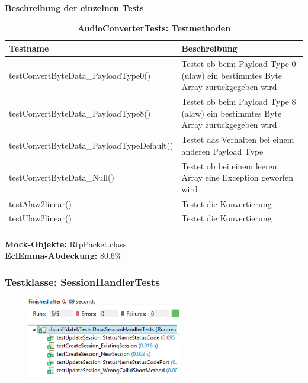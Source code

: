 \documentclass[a4,12pt]{scrartcl}
\begin{document}
\textbf{Beschreibung der einzelnen Tests}
\begin{longtable}{ p{9cm} p{6.45cm} }   
    {Testname} & {Beschreibung}\\ \midrule
    testConvertByteData\_PayloadType0() & Testet ob beim Payload Type 0 (ulaw) ein bestimmtes Byte Array zurückgegeben wird\\ \addlinespace
    testConvertByteData\_PayloadType8() & Testet ob beim Payload Type 8 (alaw) ein bestimmtes Byte Array zurückgegeben wird\\ \addlinespace
    testConvertByteData\_PayloadTypeDefault() & Testet das Verhalten bei einem anderen Payload Type\\ \addlinespace
    testConvertByteData\_Null() & Testet ob bei einem leeren Array eine Exception geworfen wird\\ \addlinespace
    testAlaw2linear() & Testet die Konvertierung\\ \addlinespace
    testUlaw2linear() & Testet die Konvertierung\\
\caption{\textbf{AudioConverterTests: Testmethoden}}
\end{longtable}

\noindent \textbf{Mock-Objekte:} RtpPacket.class\\
\textbf{EclEmma-Abdeckung:} 80.6\%

\subsubsection{Testklasse: SessionHandlerTests}
\begin{figure} [H]
	\begin{center}
	\includegraphics[width=0.60\textwidth]{./pictures/SessionHandlerTests.png}
	\label{Bild Referenz}
	\end{center}
\end{figure}
\end{document}
